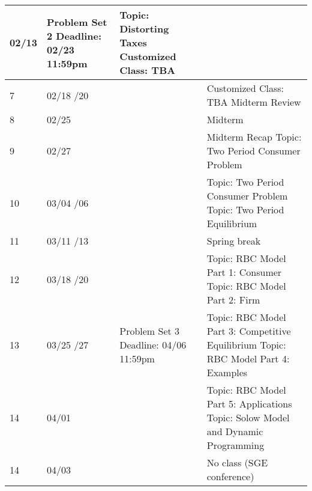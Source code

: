 \documentclass[12pt]{article}
\begin{document}
\begin{tabular}{|p{\bb}|p{\qq}|p{\rr}|p{\pp}|}
        02/13
        &
        Problem Set 2
        \newline
        Deadline: 02/23 11:59pm
        &
        Topic: Distorting Taxes
        \newline
        Customized Class: TBA
    \\
    \hline
        7
        &
        02/18
        \newline
        02/20
        &
        &
        Customized Class: TBA
        \newline
        Midterm Review
    \\
    \hline
        8
        &
        02/25
        &
        &
        Midterm
    \\
    \hline
        9
        &
        02/27
        &
        &
        Midterm Recap
        \newline
        Topic: Two Period Consumer Problem
    \\
    \hline
        10
        &
        03/04
        \newline
        03/06
        &
        &
        Topic: Two Period Consumer Problem
        \newline
        Topic: Two Period Equilibrium
    \\
    \hline
        11
        &
        03/11
        \newline
        03/13
        &
        &
        Spring break
    \\
    \hline
        12
        &
        03/18
        \newline
        03/20
        &
        &
        Topic: RBC Model Part 1: Consumer
        \newline
        Topic: RBC Model Part 2: Firm
    \\
    \hline
        13
        &
        03/25
        \newline
        03/27
        &
        Problem Set 3
        \newline
        Deadline: 04/06 11:59pm
        &
        Topic: RBC Model Part 3: Competitive Equilibrium
        \newline
        Topic: RBC Model Part 4: Examples
    \\
    \hline
        14
        &
        04/01
        &
        &
        Topic: RBC Model Part 5: Applications
        \newline
        Topic: Solow Model and Dynamic Programming
    \\
    \hline
        14
        &
        04/03
        &
        &
        No class (SGE conference)

\end{tabular}
\end{document}
